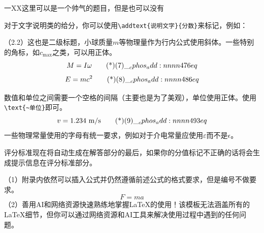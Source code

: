 \documentclass[answer]{cphos}
\begin{document}
\begin{problem}{一}{XX}{这里可以是一个帅气的题目，但是也可以没有}
\begin{solution}
对于文字说明类的给分，你可以使用\texttt{\textbackslash addtext\{说明文字\}\{分数\}}来标记，例如：

（2.2）这也是二级标题，小球质量$m$等物理量作为行内公式使用斜体。一些特别的角标，如$c_{\max}$之类，可以用正体。
\begin{equation}
    M = I\omega \eqtagscore{7}{6}
\end{equation}
\begin{equation}
    E = mc^2 \eqtagscore{8}{6}
\end{equation}

数值和单位之间需要一个空格的间隔（主要也是为了美观），单位使用正体。使用\texttt{\textbackslash text\{\textasciitilde 单位\}}即可。
\begin{equation}
    v = 1.234 \text{~m/s} \eqtagscore{9}{3}
\end{equation}
一些物理常量使用的字母有统一要求，例如对于介电常量应使用$\varepsilon$而不是$\epsilon$。

评分标准现在将自动生成在解答部分的最后，如果你的分值标记不正确的话将会生成提示信息在评分标准部分。

\begin{problemreferences}
\end{problemreferences}

\end{solution}

\begin{problemappendix}
\noindent（1）附录内依然可以插入公式并仍然遵循前述公式的格式要求，但是编号不做要求。
\begin{equation*}
    F = ma
\end{equation*}
\noindent（2）善用AI和网络资源快速熟练地掌握\LaTeX 的使用！该模板无法涵盖所有的\LaTeX 细节，但你可以通过网络资源和AI工具来解决使用过程中遇到的任何问题。
\end{problemappendix}

\end{problem}
\end{document}

